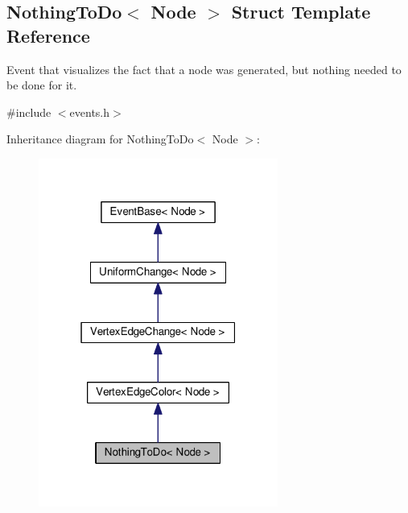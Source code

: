 \hypertarget{structNothingToDo}{}\subsection{Nothing\+To\+Do$<$ Node $>$ Struct Template Reference}
\label{structNothingToDo}


Event that visualizes the fact that a node was generated, but nothing needed to be done for it.  




{\ttfamily \#include $<$events.\+h$>$}



Inheritance diagram for Nothing\+To\+Do$<$ Node $>$\+:\nopagebreak
\begin{figure}[H]
\begin{center}
\leavevmode
\includegraphics[width=223pt]{structNothingToDo__inherit__graph}
\end{center}
\end{figure}


